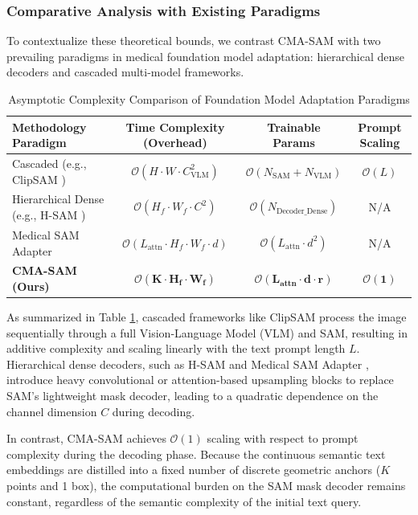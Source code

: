 \documentclass[onecolumn]{IEEEtran}
\numberwithin{equation}{section}
\theoremstyle{definition}
\theoremstyle{remark}
\begin{document}
\subsubsection{Comparative Analysis with Existing Paradigms}

To contextualize these theoretical bounds, we contrast CMA-SAM with two prevailing paradigms in medical foundation model adaptation: hierarchical dense decoders and cascaded multi-model frameworks.

\begin{table}[htbp]
\centering
\caption{Asymptotic Complexity Comparison of Foundation Model Adaptation Paradigms}
\label{tab:complexity_comparison}
\begin{tabular}{@{}lccc@{}}
\toprule
\textbf{Methodology Paradigm} & \textbf{Time Complexity (Overhead)} & \textbf{Trainable Params} & \textbf{Prompt Scaling} \\ \midrule
Cascaded (e.g., ClipSAM \cite{li2024clipsam}) & $\mathcal{O}(H \cdot W \cdot C_{\text{VLM}}^2)$ & $\mathcal{O}(N_{\text{SAM}} + N_{\text{VLM}})$ & $\mathcal{O}(L)$ \\
Hierarchical Dense (e.g., H-SAM \cite{cheng2024unleashing}) & $\mathcal{O}(H_f \cdot W_f \cdot C^2)$ & $\mathcal{O}(N_{\text{Decoder\_Dense}})$ & N/A \\
Medical SAM Adapter \cite{wu2025medical} & $\mathcal{O}(L_{\text{attn}} \cdot H_f \cdot W_f \cdot d)$ & $\mathcal{O}(L_{\text{attn}} \cdot d^2)$ & N/A \\
\textbf{CMA-SAM (Ours)} & $\mathbf{\mathcal{O}(K \cdot H_f \cdot W_f)}$ & $\mathbf{\mathcal{O}(L_{\text{attn}} \cdot d \cdot r)}$ & $\mathbf{\mathcal{O}(1)}$ \\ \bottomrule
\end{tabular}
\end{table}

As summarized in Table \ref{tab:complexity_comparison}, cascaded frameworks like ClipSAM \cite{li2024clipsam} process the image sequentially through a full Vision-Language Model (VLM) and SAM, resulting in additive complexity and scaling linearly with the text prompt length $L$. Hierarchical dense decoders, such as H-SAM \cite{cheng2024unleashing} and Medical SAM Adapter \cite{wu2025medical}, introduce heavy convolutional or attention-based upsampling blocks to replace SAM's lightweight mask decoder, leading to a quadratic dependence on the channel dimension $C$ during decoding.

In contrast, CMA-SAM achieves $\mathcal{O}(1)$ scaling with respect to prompt complexity during the decoding phase. Because the continuous semantic text embeddings are distilled into a fixed number of discrete geometric anchors ($K$ points and 1 box), the computational burden on the SAM mask decoder remains constant, regardless of the semantic complexity of the initial text query.
\end{document}
